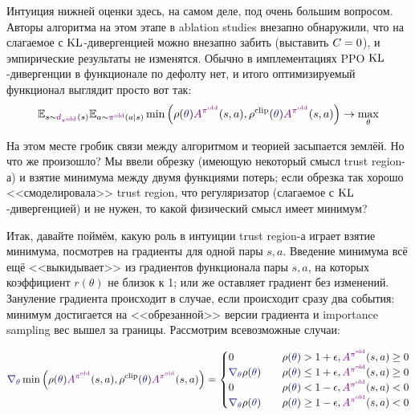 Интуиция нижней оценки здесь, на самом деле, под очень большим вопросом. Авторы алгоритма на этом этапе в ablation studies внезапно обнаружили, что на слагаемое с $\operatorname{KL}$-дивергенцией можно внезапно забить (выставить $C \HM= 0$), и эмпирические результаты не изменятся. Обычно в имплементациях PPO $\operatorname{KL}$-дивергенции в функционале по дефолту нет, и итого оптимизируемый функционал выглядит просто вот так:
\begin{equation}\label{PPOobjective}
\E_{s \sim \textcolor{ChadPurple}{d_{\pi^{\old}}}(s)} \E_{a \sim \textcolor{ChadPurple}{\pi^{\old}}(a \mid s)} \min \left( \rho(\textcolor{ChadBlue}{\theta}) \textcolor{ChadPurple}{A^{\pi^{\old}}}(s, a), \rho^{\clip}(\textcolor{ChadBlue}{\theta}) \textcolor{ChadPurple}{A^{\pi^{\old}}}(s, a)\right) \to \max_\theta
\end{equation}

На этом месте гробик связи между алгоритмом и теорией засыпается землёй. Но что же произошло? Мы ввели обрезку (имеющую некоторый смысл trust region-а) и взятие минимума между двумя функциями потерь; если обрезка так хорошо <<смоделировала>> trust region, что регуляризатор (слагаемое с $\operatorname{KL}$-дивергенцией) и не нужен, то какой физический смысл имеет минимум? 

Итак, давайте поймём, какую роль в интуиции trust region-а играет взятие минимума, посмотрев на градиенты для одной пары $s, a$. Введение минимума всё ещё <<выкидывает>> из градиентов функционала пары $s, a$, на которых коэффициент $r(\theta)$ не близок к 1; или же оставляет градиент без изменений. Зануление градиента происходит в случае, если происходит сразу два события: минимум достигается на <<обрезанной>> версии градиента и importance sampling вес вышел за границы. Рассмотрим всевозможные случаи:

$$\textcolor{ChadBlue}{\nabla_\theta} \min \left( \rho(\textcolor{ChadBlue}{\theta}) \textcolor{ChadPurple}{A^{\pi^{\old}}}(s, a), \rho^{\clip}(\textcolor{ChadBlue}{\theta}) \textcolor{ChadPurple}{A^{\pi^{\old}}}(s, a)\right) = 
\begin{cases}
0 \quad & \rho(\textcolor{ChadBlue}{\theta}) > 1 + \epsilon, \textcolor{ChadPurple}{A^{\pi^{\old}}}(s, a) \ge 0 \\
\textcolor{ChadBlue}{\nabla_\theta} \rho(\textcolor{ChadBlue}{\theta}) \quad &\rho(\textcolor{ChadBlue}{\theta}) \le 1 + \epsilon, \textcolor{ChadPurple}{A^{\pi^{\old}}}(s, a) \ge 0 \\
0 \quad & \rho(\textcolor{ChadBlue}{\theta}) < 1 - \epsilon, \textcolor{ChadPurple}{A^{\pi^{\old}}}(s, a) < 0 \\
\textcolor{ChadBlue}{\nabla_\theta} \rho(\textcolor{ChadBlue}{\theta}) \quad &\rho(\textcolor{ChadBlue}{\theta}) \ge 1 - \epsilon, \textcolor{ChadPurple}{A^{\pi^{\old}}}(s, a) < 0 \\
\end{cases}
$$


